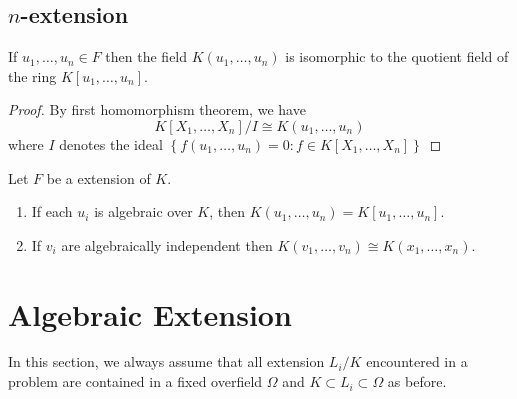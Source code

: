 \subsection{$n$-extension}
\begin{theorem}
    If $u_1, \ldots, u_n \in F$ then the field $K\left(u_1, \ldots, u_n\right)$ is isomorphic to the quotient field of the ring $K\left[u_1, \ldots, u_n\right]$.
    \begin{proof}
        By first homomorphism theorem, we have
        \begin{equation*}
            K\left[X_1, \ldots, X_n\right]/I
            \cong
            K\left(u_1, \ldots, u_n\right)
        \end{equation*}
        where $I$ denotes the ideal $\left\{f\left(u_1, \ldots, u_n\right)=0: f \in K\left[X_1, \ldots, X_n\right]\right\}$
    \end{proof}
\end{theorem}
\begin{theorem}
    Let $F$ be a extension of $K$.
    \begin{enumerate}
        \item
              If each $u_i$ is algebraic over $K$, then $K\left(u_1, \ldots, u_n\right)=K\left[u_1, \ldots, u_n\right]$.
        \item
              If $v_i$ are algebraically independent then $K\left(v_1, \ldots, v_n\right)\cong K\left(x_1, \ldots, x_n\right)$.
    \end{enumerate}
\end{theorem}


\section{Algebraic Extension} %

In this section, we always assume that all extension $L_i/K$ encountered in a problem are contained in a fixed overfield $\Omega$ and $K\subset L_i \subset \Omega$ as before.

